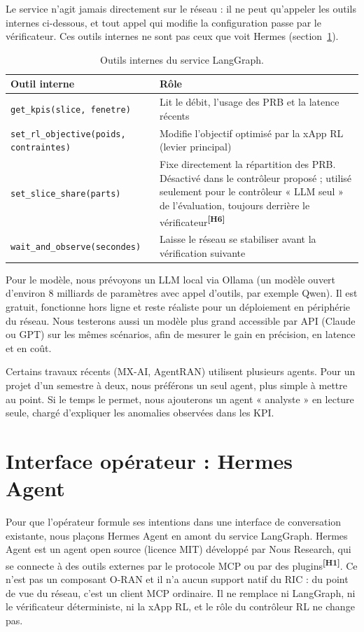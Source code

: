 \documentclass[11pt,a4paper]{article}
\newcommand{\hyp}[1]{\textsuperscript{\textbf{[H#1]}}}
\newcommand{\tool}[1]{\texttt{#1}}
\begin{document}
Le service n'agit jamais directement sur le réseau : il ne peut qu'appeler les outils
internes ci-dessous, et tout appel qui modifie la configuration passe par le vérificateur.
Ces outils internes ne sont pas ceux que voit Hermes (section~\ref{sec:hermes}).

\begin{table}[H]
\centering\small
\begin{tabularx}{\textwidth}{@{}P{5.6cm}L@{}}
\toprule
Outil interne & Rôle\\
\midrule
\tool{get\_kpis(slice, fenetre)} & Lit le débit, l'usage des PRB et la latence récents\\
\tool{set\_rl\_objective(poids, contraintes)} & Modifie l'objectif optimisé par la xApp RL (levier principal)\\
\tool{set\_slice\_share(parts)} & Fixe directement la répartition des PRB. Désactivé dans le contrôleur proposé ; utilisé seulement pour le contrôleur « LLM seul » de l'évaluation, toujours derrière le vérificateur\hyp{6}\\
\tool{wait\_and\_observe(secondes)} & Laisse le réseau se stabiliser avant la vérification suivante\\
\bottomrule
\end{tabularx}
\caption{Outils internes du service LangGraph.}
\end{table}

Pour le modèle, nous prévoyons un LLM local via Ollama (un modèle ouvert d'environ
8 milliards de paramètres avec appel d'outils, par exemple Qwen). Il est gratuit,
fonctionne hors ligne et reste réaliste pour un déploiement en périphérie du réseau.
Nous testerons aussi un modèle plus grand accessible par API (Claude ou GPT) sur les
mêmes scénarios, afin de mesurer le gain en précision, en latence et en coût.

Certains travaux récents (MX-AI, AgentRAN) utilisent plusieurs agents. Pour un projet
d'un semestre à deux, nous préférons un seul agent, plus simple à mettre au point. Si le
temps le permet, nous ajouterons un agent « analyste » en lecture seule, chargé
d'expliquer les anomalies observées dans les KPI.

\section{Interface opérateur : Hermes Agent}
\label{sec:hermes}

Pour que l'opérateur formule ses intentions dans une interface de conversation existante,
nous plaçons Hermes Agent en amont du service LangGraph. Hermes Agent est un agent open
source (licence MIT) développé par Nous Research, qui se connecte à des outils externes
par le protocole MCP ou par des plugins\hyp{1}. Ce n'est pas un composant O-RAN et il n'a
aucun support natif du RIC : du point de vue du réseau, c'est un client MCP ordinaire. Il
ne remplace ni LangGraph, ni le vérificateur déterministe, ni la xApp RL, et le rôle du
contrôleur RL ne change pas.
\end{document}
